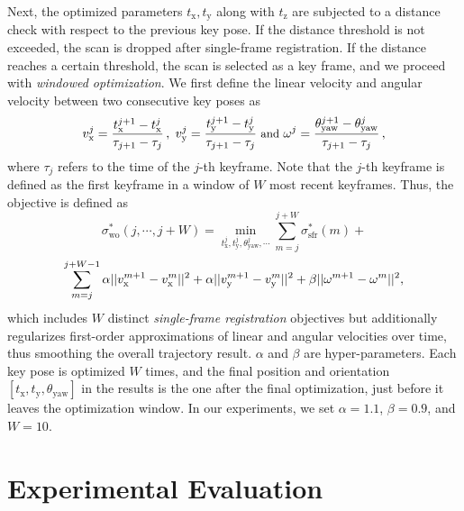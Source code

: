 \documentclass[letterpaper, 10 pt, conference]{ieeeconf}  %
\begin{document}
Next, the optimized parameters $t_\text{x}, t_\text{y}$ along with $t_\text{z}$ are subjected to a distance check with respect to the previous key pose. If the distance threshold is not exceeded, the scan is dropped after single-frame registration. If the distance reaches a certain threshold, the scan is selected as a key frame, and we proceed with \textit{windowed optimization}. We first define the linear velocity and angular velocity between two consecutive key poses as  
%
\begin{equation}
    \small
    v_\text{x}^j = \frac{t_\text{x}^{j+1} - t_\text{x}^{j}}{\tau_{j+1} - \tau_{j}} \,, \ 
    v_\text{y}^j = \frac{t_\text{y}^{j+1} - t_\text{y}^{j}}{\tau_{j+1} - \tau_{j}} \text{ and } 
    \omega^j = \frac{\theta_\text{yaw}^{j+1} - \theta_\text{yaw}^{j}}{\tau_{j+1} - \tau_{j}} \,,
\end{equation}
%
where $\tau_j$ refers to the time of the $j$-th keyframe. Note that the $j$-th keyframe is defined as the first keyframe in a window of $W$ most recent keyframes. Thus, the objective is defined as
%
\begin{equation}
    \sigma^*_{\text{wo}}(j, \cdots, j+W) = \min_{t_\text{x}^j, t_\text{y}^j, \theta^j_{\text{yaw}}, \cdots} 
                                           \sum_{m = j}^{j+W} \sigma^*_{\text{sfr}}(m) + \nonumber
\end{equation}
\begin{equation}
    \small
    \sum_{m = j}^{j+W-1} \alpha ||v_\text{x}^{m+1} - v_\text{x}^{m}||^2 + \alpha ||v_\text{y}^{m+1} - v_\text{y}^{m}||^2 + \beta ||\omega^{m+1} - \omega^{m}||^2,
\end{equation}
%
which includes $W$ distinct \textit{single-frame registration} objectives but additionally regularizes first-order approximations of linear and angular velocities over time, thus smoothing the overall trajectory result. $\alpha$ and $\beta$ are hyper-parameters. Each key pose is optimized $W$ times, and the final position and orientation $[t_\text{x}, t_\text{y}, \theta_{\text{yaw}}]$ in the results is the one after the final optimization, just before it leaves the optimization window. In our experiments, we set $\alpha = 1.1$, $\beta = 0.9$, and $W = 10$.


\section{Experimental Evaluation}
\end{document}
